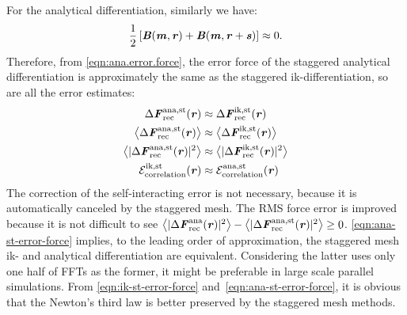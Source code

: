 \documentclass[journal=jacsat,manuscript=article]{achemso}
\renewcommand{\v}[1]{\textbf{\textit{#1}}}
\begin{document}
For the analytical differentiation, similarly we have:
\begin{align}\label{eqn:leading-order-2}
\frac12\,[\v
B(\v m,\v r) + \v B(\v m, \v r+\v s)] \approx 0.  
\end{align}
Therefore, from
\ref{eqn:ana.error.force}, the error force of the staggered
analytical differentiation is approximately the same as the staggered
ik-differentiation, so are all the error estimates:
\begin{align}\label{eqn:ana-st-error-force}
  \Delta\v F^{\textrm{ana,st}}_{\textrm{rec}}(\v r)
  &\approx
  \Delta\v F^{\textrm{ik,st}}_{\textrm{rec}}(\v r)\\
  \big\langle
  \Delta\v F_{\textrm{rec}}^{\textrm{ana,st}}(\v r)
  \big\rangle
  &\approx
  \big\langle
  \Delta\v F_{\textrm{rec}}^{\textrm{ik,st}}(\v r)
  \big\rangle\\
  \big\langle
  \vert\Delta\v F_{\textrm{rec}}^{\textrm{ana,st}}(\v r)\vert^2
  \big\rangle
  &\approx
  \big\langle
  \vert\Delta\v F_{\textrm{rec}}^{\textrm{ik,st}}(\v r)\vert^2
  \big\rangle\\
  \mathcal E^{\textrm{ik,st}}_{\textrm{correlation}}(\v r)
  &\approx
  \mathcal E^{\textrm{ana,st}}_{\textrm{correlation}}(\v r)
\end{align}
The correction of the self-interacting error is not necessary,
because it is automatically canceled by the staggered mesh.
The RMS force error is improved because it is not
difficult to see 
$\big\langle\vert\Delta\v F_{\textrm{rec}}^{\textrm{ana}}(\v r)\vert^2\big\rangle -
\big\langle\vert\Delta\v F_{\textrm{rec}}^{\textrm{ana,st}}(\v r)\vert^2\big\rangle
\geq 0$.
\ref{eqn:ana-st-error-force} implies, to the
leading order of approximation, the staggered
mesh ik- and analytical differentiation
are equivalent. Considering the latter uses
only one half of  FFTs as the former, it might be preferable
in large scale parallel simulations.
From \ref{eqn:ik-st-error-force}
and~\ref{eqn:ana-st-error-force}, it is obvious that the Newton's
third law is better preserved by the staggered mesh methods.



\end{document}
